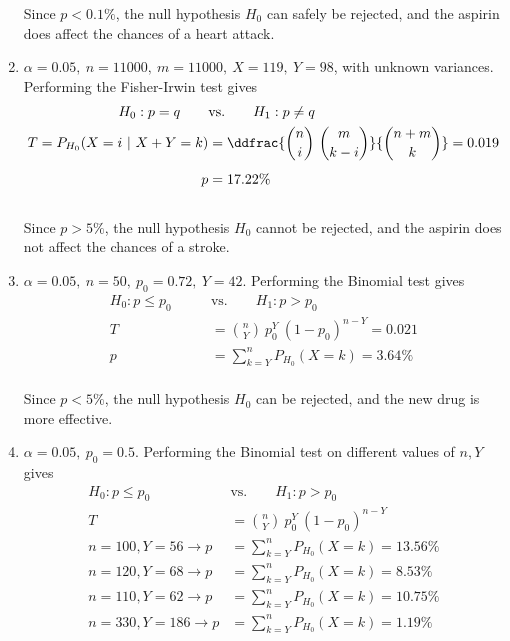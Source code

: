 \begin{enumerate}
	Since $ p < 0.1\% $, the null hypothesis $ H_0 $ can safely be rejected, and the aspirin does affect the chances of a heart attack.\\
	
	
	\item $\alpha = 0.05,\ n = 11000,\ m = 11000,\ X = 119,\ Y = 98$, with unknown variances. Performing the Fisher-Irwin test gives\\
	
	\begin{align}
		H_0 : p  = q \qquad &\text{vs.} \qquad H_1 : p  \neq q \nonumber \\
		T = P_{H_0}(X = i\ |\ X+Y = k) &= \ddfrac{\binom{n}{i}\ \binom{m}{k-i}}{\binom{n+m}{k}} = 0.019 \nonumber \\[1ex]
		p &= 17.22\%
	\end{align}\\
	
	Since $ p > 5\% $, the null hypothesis $ H_0 $ cannot be rejected, and the aspirin does not affect the chances of a stroke.\\
	
	\item $\alpha = 0.05,\ n = 50,\ p_0 = 0.72,\ Y = 42$. Performing the Binomial test gives\\
	
	\begin{align}
		H_0 : p  \leq p_0 \qquad &\text{vs.} \qquad H_1 : p > p_0 \nonumber \\
		T &= \binom{n}{Y}\ p_0^Y\ (1-p_0)^{n-Y}  = 0.021 \nonumber \\
		p &= \sum\limits_{k = Y}^{n} P_{H_0}(X = k) = 3.64\%
	\end{align}\\
	
	Since $ p < 5\% $, the null hypothesis $ H_0 $ can be rejected, and the new drug is more effective.\\
	
	\item $\alpha = 0.05,\ p_0 = 0.5 $. Performing the Binomial test on different values of $ n, Y $ gives\\
	
	\begin{align}
		H_0 : p  \leq p_0 \qquad &\text{vs.} \qquad H_1 : p > p_0 \nonumber \\
		T &= \binom{n}{Y}\ p_0^Y\ (1-p_0)^{n-Y} \nonumber \\
		n = 100, Y = 56 \to p &= \sum\limits_{k = Y}^{n} P_{H_0}(X = k) = 13.56\% \nonumber \\
		n = 120, Y = 68 \to p &= \sum\limits_{k = Y}^{n} P_{H_0}(X = k) = 8.53\% \nonumber \\
		n = 110, Y = 62 \to p &= \sum\limits_{k = Y}^{n} P_{H_0}(X = k) = 10.75\% \nonumber \\
		n = 330, Y = 186 \to p &= \sum\limits_{k = Y}^{n} P_{H_0}(X = k) = 1.19\% 
	\end{align}\\
	

\end{enumerate}
